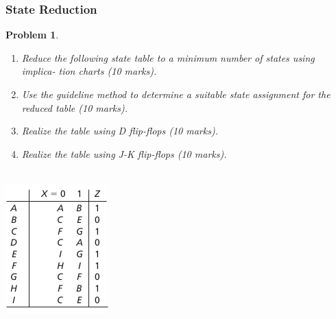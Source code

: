 \documentclass[twocolumn]{article}
\newtheorem{prob}{Problem}
\begin{document}
\subsubsection*{State Reduction}
\begin{prob}
  \begin{enumerate}
  \item Reduce the following state table to a minimum number of states using implica-
    tion charts (10 marks).
  \item Use the guideline method to determine a suitable state assignment for the
    reduced table (10 marks).
  \item Realize the table using D flip-flops (10 marks).
  \item Realize the table using J-K flip-flops (10 marks).
  \end{enumerate}\\
  \includegraphics[width=\linewidth]{fig-15.25.png}
\end{prob}




\end{document}
